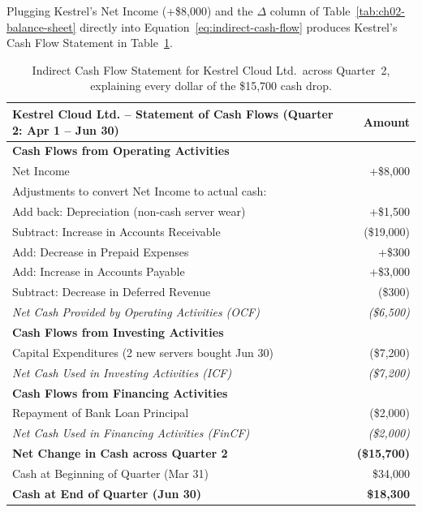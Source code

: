 Plugging Kestrel's Net Income (+\$8,000) and the $\Delta$ column of Table~\ref{tab:ch02-balance-sheet} directly into Equation~\eqref{eq:indirect-cash-flow} produces Kestrel's Cash Flow Statement in Table~\ref{tab:ch02-cash-flow-statement}.

\begin{table}[htbp]
\centering
\small
\begin{tabular}{@{}lr@{}}
\toprule
\textbf{Kestrel Cloud Ltd. -- Statement of Cash Flows (Quarter 2: Apr 1 -- Jun 30)} & \textbf{Amount} \\
\midrule
\textbf{Cash Flows from Operating Activities}              &              \\
\quad Net Income                                           & +\$8,000     \\
\quad Adjustments to convert Net Income to actual cash:    &              \\
\quad\quad Add back: Depreciation (non-cash server wear)   & +\$1,500     \\
\quad\quad Subtract: Increase in Accounts Receivable       & (\$19,000)   \\
\quad\quad Add: Decrease in Prepaid Expenses               & +\$300       \\
\quad\quad Add: Increase in Accounts Payable               & +\$3,000     \\
\quad\quad Subtract: Decrease in Deferred Revenue          & (\$300)      \\
\emph{Net Cash Provided by Operating Activities (OCF)}     & \emph{(\$6,500)} \\
\midrule
\textbf{Cash Flows from Investing Activities}              &              \\
\quad Capital Expenditures (2 new servers bought Jun 30)   & (\$7,200)    \\
\emph{Net Cash Used in Investing Activities (ICF)}         & \emph{(\$7,200)} \\
\midrule
\textbf{Cash Flows from Financing Activities}              &              \\
\quad Repayment of Bank Loan Principal                     & (\$2,000)    \\
\emph{Net Cash Used in Financing Activities (FinCF)}       & \emph{(\$2,000)} \\
\midrule
\textbf{Net Change in Cash across Quarter 2}               & \textbf{(\$15,700)} \\
Cash at Beginning of Quarter (Mar 31)                      & \$34,000     \\
\textbf{Cash at End of Quarter (Jun 30)}                   & \textbf{\$18,300} \\
\bottomrule
\end{tabular}
\caption{Indirect Cash Flow Statement for Kestrel Cloud Ltd.\ across Quarter~2, explaining every dollar of the \$15,700 cash drop.}
\label{tab:ch02-cash-flow-statement}
\end{table}

